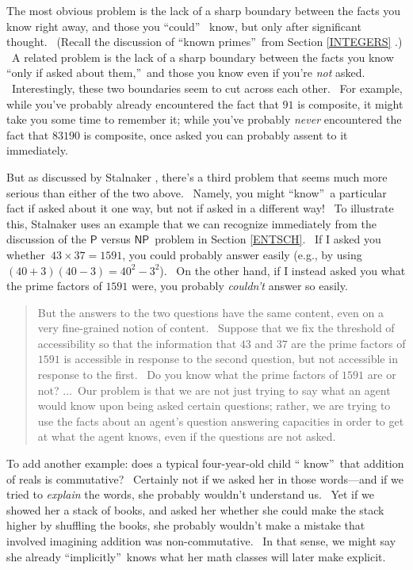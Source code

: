 \documentclass[11pt,onecolumn]{article}%
\begin{document}
The most obvious problem is the lack of a sharp boundary between the facts you
know right away, and those you \textquotedblleft could\textquotedblright%
\ know, but only after significant thought. \ (Recall the discussion of
\textquotedblleft known primes\textquotedblright\ from Section \ref{INTEGERS}%
.) \ A related problem is the lack of a sharp boundary between the facts you
know \textquotedblleft only if asked about them,\textquotedblright\ and those
you know even if you're \textit{not} asked. \ Interestingly, these two
boundaries seem to cut across each other. \ For example, while you've probably
already encountered the fact that $91$ is composite, it might take you some
time to remember it; while you've probably \textit{never} encountered the fact
that $83190$ is composite, once asked you can probably assent to it immediately.

But as discussed by Stalnaker \cite{stalnaker}, there's a third problem that
seems much more serious than either of the two above. \ Namely, you might
\textquotedblleft know\textquotedblright\ a particular fact if asked about it
one way, but not if asked in a different way! \ To illustrate this, Stalnaker
uses an example that we can recognize immediately from the discussion of the
$\mathsf{P}$ versus $\mathsf{NP}$\ problem in Section \ref{ENTSCH}. \ If I
asked you whether\ $43\times37=1591$, you could probably answer easily (e.g.,
by using $\left(  40+3\right)  \left(  40-3\right)  =40^{2}-3^{2}$). \ On the
other hand, if I instead asked you what the prime factors of $1591$ were, you
probably \textit{couldn't} answer so easily.

\begin{quotation}
\noindent But the answers to the two questions have the same content, even on
a very fine-grained notion of content. \ Suppose that we fix the threshold of
accessibility so that the information that $43$ and $37$ are the prime factors
of $1591$ is accessible in response to the second question, but not accessible
in response to the first. \ Do you know what the prime factors of $1591$ are
or not? ...\ Our problem is that we are not just trying to say what an agent
would know upon being asked certain questions; rather, we are trying to use
the facts about an agent's question answering capacities in order to get at
what the agent knows, even if the questions are not asked. \cite[p.
253]{stalnaker}
\end{quotation}

To add another example: does a typical four-year-old child \textquotedblleft
know\textquotedblright\ that addition of reals is commutative? \ Certainly not
if we asked her in those words---and if we tried to \textit{explain} the
words, she probably wouldn't understand us. \ Yet if we showed her a stack of
books, and asked her whether she could make the stack higher by shuffling the
books, she probably wouldn't make a mistake that involved imagining addition
was non-commutative. \ In that sense, we might say she already
\textquotedblleft implicitly\textquotedblright\ knows what her math classes
will later make explicit.
\end{document}
